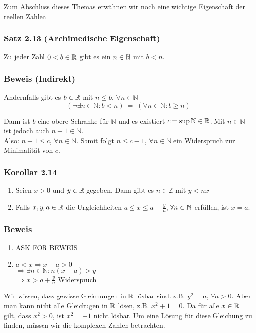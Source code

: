 Zum Abschluss dieses Themas erwähnen wir noch eine wichtige Eigenschaft der reellen Zahlen

\subsubsection*{Satz 2.13 (Archimedische Eigenschaft)}
Zu jeder Zahl $0<b\in\mathbb{R}$ gibt es ein $n\in\mathbb{N}$ mit $b<n$.
\subsubsection*{Beweis (Indirekt)}
Andernfalls gibt es $b\in\mathbb{R}$ mit $n\leq b$, $\forall n\in\mathbb{N}$ 
\[  (\lnot\exists n\in\mathbb{N}:b<n) \; = \; (\forall n\in\mathbb{N}:b\geq n)   \]

Dann ist $b$ eine obere Schranke für $\mathbb{N}$ und es existiert $c=\sup\mathbb{N}\in\mathbb{R}$. Mit $n\in\mathbb{N}$ ist jedoch auch $n+1\in\mathbb{N}$.\\
Also: $n+1\leq c$, $\forall n\in\mathbb{N}$. Somit folgt $n\leq c-1$, $\forall n\in\mathbb{N}$ ein Widerspruch zur Minimalität von $c$.

\subsubsection*{Korollar 2.14}
\begin{enumerate}
    \item Seien $x>0$ und $y\in\mathbb{R}$ gegeben. Dann gibt es $n\in\mathbb{Z}$ mit $y<nx$
    \item Falls $x,y,a\in\mathbb{R}$ die Ungleichheiten $a\leq x\leq a+\frac{y}{n}$, $\forall n\in\mathbb{N}$ erfüllen, ist $x=a$.
\end{enumerate}
\subsubsection*{Beweis}

\begin{enumerate}
    \item ASK FOR BEWEIS
    \item $a<x\Rightarrow x-a>0$\\
    $\Rightarrow \exists n\in\mathbb{N}: n(x-a) > y$\\
	$\Rightarrow x>a+\frac{y}{n}$ Widerspruch
\end{enumerate}
Wir wissen, dass gewisse Gleichungen in $\mathbb{R}$ lösbar sind: z.B. $y^2=a$, $\forall a>0$. Aber man kann nicht alle Gleichugen in $\mathbb{R}$ lösen, z.B. $x^2+1=0$. Da für alle $x\in\mathbb{R}$ gilt, dass $x^2>0$, ist $x^2=-1$ nicht lösbar. Um eine Lösung für diese Gleichung zu finden, müssen wir die komplexen Zahlen betrachten.\\

